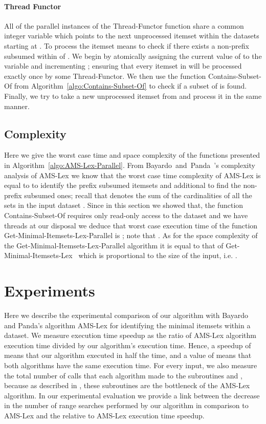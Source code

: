 \documentclass[13pt,a4paper]{article}
\begin{document}
\paragraph{Thread Functor}
All of the parallel instances of the Thread-Functor function share a common integer variable  which points to the next unprocessed itemset  within the datasets starting at . To process the itemset  means to check if there exists a non-prefix subsumed within  of . We begin by atomically assigning the current value of  to the variable  and incrementing ; ensuring that every itemset in  will be processed exactly once by some Thread-Functor. We then use the function Contains-Subset-Of from Algorithm~\ref{algo:Contains-Subset-Of} to check if a subset of  is found. Finally, we try to take a new unprocessed itemset from  and process it in the same manner.


\subsection{Complexity}
Here we give the worst case time and space complexity of the functions presented in Algorithm~\ref{algo:AMS-Lex-Parallel}. From Bayardo~and~Panda~\cite{BayardoPanda11}'s complexity analysis of AMS-Lex we know that the worst case time complexity of AMS-Lex is equal to   to identify the prefix subsumed itemsets and additional  to find the non-prefix subsumed ones; recall that  denotes the sum of the cardinalities of all the sets in the input dataset . Since in this section we showed that, the function Contains-Subset-Of requires only read-only access to the dataset  and we have  threads at our disposal we deduce that worst case execution time of the function Get-Minimal-Itemsets-Lex-Parallel is ; note that . As for the space complexity of the Get-Minimal-Itemsets-Lex-Parallel algorithm it is equal to that of Get-Minimal-Itemsets-Lex~\cite{BayardoPanda11} which is proportional to the size of the input, i.e. .


\section{Experiments}
\label{sec:experiments}

Here we describe the experimental comparison of our algorithm with Bayardo and Panda's algorithm AMS-Lex for identifying the minimal itemsets within a dataset. We measure execution time speedup as the ratio of AMS-Lex algorithm execution time divided by our algorithm's execution time. Hence, a speedup of  means that our algorithm executed in half the time, and a value of  means that both algorithms have the same execution time. For every input, we also measure the total number of calls that each algorithm made to the subroutines  and , because as described in \cite{BayardoPanda11}, these subroutines are the bottleneck of the AMS-Lex algorithm. In our experimental evaluation we provide a link between the decrease in the number of range searches performed by our algorithm in comparison to AMS-Lex and the relative to AMS-Lex execution time speedup.
\end{document}
